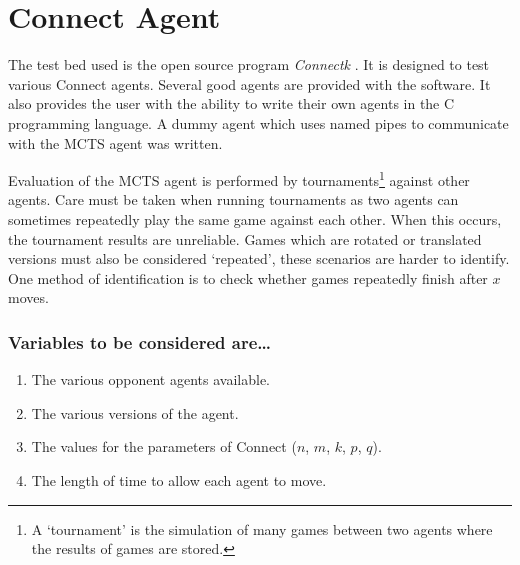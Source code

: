 




\section{{Connect} Agent}
The test bed used is the open source program \textit{Connectk} \cite{connectk}. It is designed to test various {Connect} agents. Several good agents are provided with the software. It also provides the user with the ability to write their own agents in the {C} programming language. A dummy agent which uses named pipes to communicate with the {MCTS} agent was written.

Evaluation of the {MCTS} agent is performed by tournaments\footnote{A `tournament' is the simulation of many games between two agents where the results of games are stored.} against other agents. Care must be taken when running tournaments as two agents can sometimes repeatedly play the same game against each other. When this occurs, the tournament results are unreliable. Games which are rotated or translated versions must also be considered `repeated', these scenarios are harder to identify. One method of identification is to check whether games repeatedly finish after $x$ moves. 
\subsubsection{Variables to be considered are\ldots}
\begin{enumerate}
\item The various opponent agents available.
\item The various versions of the agent.
\item The values for the parameters of {Connect} ($n$, $m$, $k$, $p$, $q$).
\item The length of time to allow each agent to move.
\end{enumerate}


